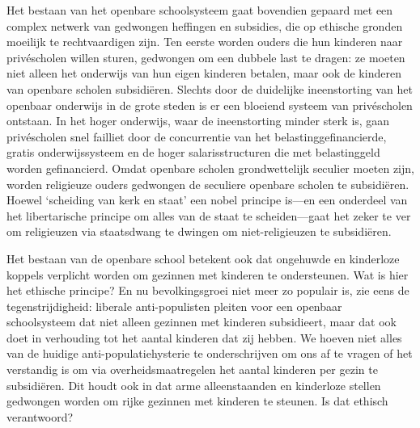\documentclass[
  a5paper,
  smalldemyvopaper,10pt,twoside,onecolumn,openright,extrafontsizes,hidelinks]{memoir}
\begin{document}
Het bestaan van het openbare schoolsysteem gaat bovendien gepaard met
een complex netwerk van gedwongen heffingen en subsidies, die op
ethische gronden moeilijk te rechtvaardigen zijn. Ten eerste worden
ouders die hun kinderen naar privéscholen willen sturen, gedwongen om
een dubbele last te dragen: ze moeten niet alleen het onderwijs van hun
eigen kinderen betalen, maar ook de kinderen van openbare scholen
subsidiëren. Slechts door de duidelijke ineenstorting van het openbaar
onderwijs in de grote steden is er een bloeiend systeem van privéscholen
ontstaan. In het hoger onderwijs, waar de ineenstorting minder sterk is,
gaan privéscholen snel failliet door de concurrentie van het
belastinggefinancierde, gratis onderwijssysteem en de hoger
salarisstructuren die met belastinggeld worden gefinancierd. Omdat
openbare scholen grondwettelijk seculier moeten zijn, worden religieuze
ouders gedwongen de seculiere openbare scholen te subsidiëren. Hoewel
`scheiding van kerk en staat' een nobel principe is---en een onderdeel
van het libertarische principe om alles van de staat te scheiden---gaat
het zeker te ver om religieuzen via staatsdwang te dwingen om
niet-religieuzen te subsidiëren.

Het bestaan van de openbare school betekent ook dat ongehuwde en
kinderloze koppels verplicht worden om gezinnen met kinderen te
ondersteunen. Wat is hier het ethische principe? En nu bevolkingsgroei
niet meer zo populair is, zie eens de tegenstrijdigheid: liberale
anti-populisten pleiten voor een openbaar schoolsysteem dat niet alleen
gezinnen met kinderen subsidieert, maar dat ook doet in verhouding tot
het aantal kinderen dat zij hebben. We hoeven niet alles van de huidige
anti-populatiehysterie te onderschrijven om ons af te vragen of het
verstandig is om via overheidsmaatregelen het aantal kinderen per gezin
te subsidiëren. Dit houdt ook in dat arme alleenstaanden en kinderloze
stellen gedwongen worden om rijke gezinnen met kinderen te steunen. Is
dat ethisch verantwoord?
\end{document}
